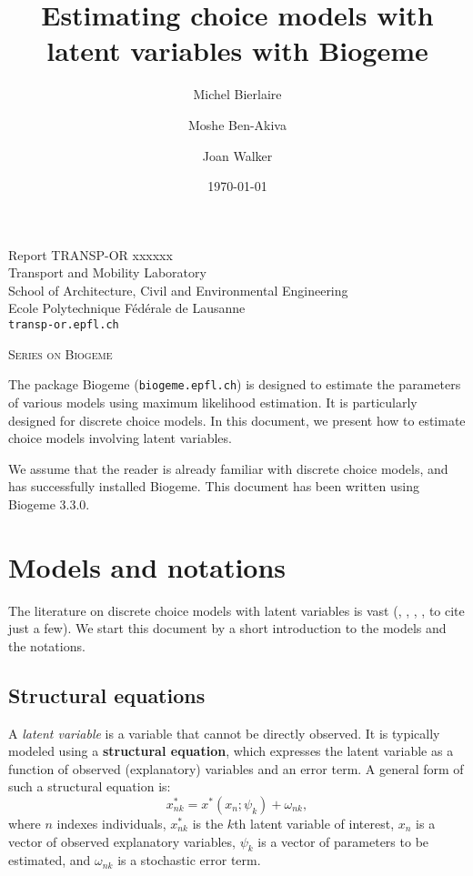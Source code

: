 \documentclass[12pt,a4paper]{article}
\title{Estimating choice models with latent variables with Biogeme}
\author{Michel Bierlaire \and Moshe Ben-Akiva \and Joan Walker}
\date{\today}
\begin{document}
\begin{titlepage}
\pagestyle{empty}

\maketitle
\vspace{2cm}

\begin{center}
\small Report TRANSP-OR xxxxxx  \\ Transport and Mobility Laboratory \\ School of Architecture, Civil and Environmental Engineering \\ Ecole Polytechnique F\'ed\'erale de Lausanne \\ \verb+transp-or.epfl.ch+
\begin{center}
\textsc{Series on Biogeme}
\end{center}
\end{center}


\clearpage
\end{titlepage}

\begin{titlepage}
\tableofcontents
\end{titlepage}

The package Biogeme (\texttt{biogeme.epfl.ch}) is designed to estimate
the parameters of various models using maximum likelihood
estimation. It is particularly designed for discrete choice
models.  In this document, we present how to estimate choice
models involving latent variables.

We assume that the reader is already familiar with discrete choice
models, and has successfully installed Biogeme. This document has
been written using Biogeme 3.3.0.



\section{Models and notations}

The literature on discrete choice models with latent variables is vast
(\cite{walker2001extended}, \cite{ashok2002extending},
\cite{greene2003latent}, \cite{ben2002integration}, to cite just a
few). We start this document by a short introduction to the models and
the notations. 

\subsection{Structural equations}
A \emph{latent variable} is a variable that cannot be directly
observed. It is typically modeled using a \textbf{structural
  equation}, which expresses the latent variable as a function of
observed (explanatory) variables and an error term. A general form of
such a structural equation is:
\begin{equation}
\label{eq:structural}
x_{nk}^* = x^*(x_n; \psi_k) + \omega_{nk},
\end{equation}
where $n$ indexes individuals, $x_{nk}^*$ is the $k$th latent variable of interest, $x_n$ is a vector of observed explanatory variables, $\psi_k$ is a vector of parameters to be estimated, and $\omega_{nk}$ is a stochastic error term.
\end{document}
